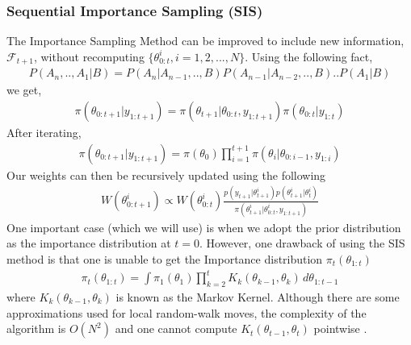 \documentclass[12pt]{article}
\theoremstyle{definition}
\begin{document}
\subsubsection{Sequential Importance Sampling (SIS)}
The Importance Sampling Method can be improved to include new information, $\mathcal{F}_{t+1}$, without recomputing $\{\theta_{0:t}^{i},i=1,2,...,N\}$. Using the following fact,
\begin{equation}\label{eq:4}
	\begin{aligned}
		P(A_{n},..,A_{1}|B) = P(A_{n}|A_{n-1},..,B)P(A_{n-1}|A_{n-2},..,B)..P(A_{1}|B)
	\end{aligned}
\end{equation}
we get,
\begin{equation} \label{eq:5}
	\begin{aligned}
		\pi(\theta_{0:t+1}|y_{1:t+1}) = \pi(\theta_{t+1}|\theta_{0:t},y_{1:t+1})\pi(\theta_{0:t}|y_{1:t})
	\end{aligned}
\end{equation}
After iterating,
\begin{equation}
	\begin{aligned}
		\pi(\theta_{0:t+1}|y_{1:t+1}) = \pi(\theta_{0})\prod_{i=1}^{t+1}\pi(\theta_{i}|\theta_{0:i-1},y_{1:i})
	\end{aligned}
\end{equation}
Our weights can then be recursively updated using the following
\begin{equation}
	\begin{aligned}
		W(\theta_{0:t+1}^{i}) \propto W(\theta_{0:t}^{i}) \frac{p(y_{t+1}|\theta_{t+1}^{i})p(\theta_{t+1}^{i}|\theta_{t}^{i})}{\pi(\theta_{t+1}^{i}|\theta_{0:t}^{i},y_{1:t+1})}
	\end{aligned}
\end{equation}
One important case (which we will use) is when we adopt the prior distribution as the importance distribution at $t=0$. However, one drawback of using the SIS method is that one is unable to get the Importance distribution $\pi_{t}(\theta_{1:t})$
\begin{equation}
	\begin{aligned}
		\pi_{t}(\theta_{1:t}) = \int \pi_{1}(\theta_{1})\prod_{k=2}^{t}K_{k}(\theta_{k-1},\theta_{k}) \,d\theta_{1:t-1}
	\end{aligned}
\end{equation}
where $K_{k}(\theta_{k-1},\theta_{k})$ is known as the Markov Kernel. Although there are some approximations used for local random-walk moves, the complexity of the algorithm is $O(N^2)$ and one cannot compute $K_{t}(\theta_{t-1},\theta_{t})$ pointwise \citep{del2006sequential}.
\end{document}

